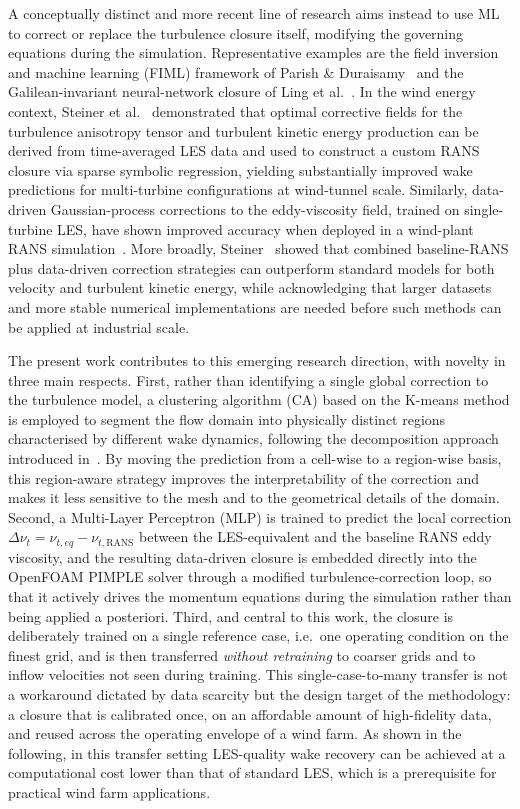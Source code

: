 A conceptually distinct and more recent line of research aims instead to use ML to correct or replace the turbulence closure itself, modifying the governing equations during the simulation. Representative examples are the field inversion and machine learning (FIML) framework of Parish \& Duraisamy~\cite{Duraisamy2019} and the Galilean-invariant neural-network closure of Ling et al.~\cite{Ling2016}. In the wind energy context, Steiner et al.~\cite{Steiner2021} demonstrated that optimal corrective fields for the turbulence anisotropy tensor and turbulent kinetic energy production can be derived from time-averaged LES data and used to construct a custom RANS closure via sparse symbolic regression, yielding substantially improved wake predictions for multi-turbine configurations at wind-tunnel scale. Similarly, data-driven Gaussian-process corrections to the eddy-viscosity field, trained on single-turbine LES, have shown improved accuracy when deployed in a wind-plant RANS simulation~\cite{King_2018}. More broadly, Steiner~\cite{72116acdc5aa4b3b8fc752f1b2fa9958} showed that combined baseline-RANS plus data-driven correction strategies can outperform standard models for both velocity and turbulent kinetic energy, while acknowledging that larger datasets and more stable numerical implementations are needed before such methods can be applied at industrial scale.

The present work contributes to this emerging research direction, with novelty in three main respects. First, rather than identifying a single global correction to the turbulence model, a clustering algorithm (CA) based on the K-means method is employed to segment the flow domain into physically distinct regions characterised by different wake dynamics, following the decomposition approach introduced in~\cite{Clustering_tieghi,Carloni2026}. By moving the prediction from a cell-wise to a region-wise basis, this region-aware strategy improves the interpretability of the correction and makes it less sensitive to the mesh and to the geometrical details of the domain. Second, a Multi-Layer Perceptron (MLP) is trained to predict the local correction $\Delta\nu_t = \nu_{t,eq} - \nu_{t,\mathrm{RANS}}$ between the LES-equivalent and the baseline RANS eddy viscosity, and the resulting data-driven closure is embedded directly into the OpenFOAM PIMPLE solver through a modified turbulence-correction loop, so that it actively drives the momentum equations during the simulation rather than being applied a posteriori. Third, and central to this work, the closure is deliberately trained on a single reference case, i.e.\ one operating condition on the finest grid, and is then transferred \emph{without retraining} to coarser grids and to inflow velocities not seen during training. This single-case-to-many transfer is not a workaround dictated by data scarcity but the design target of the methodology: a closure that is calibrated once, on an affordable amount of high-fidelity data, and reused across the operating envelope of a wind farm. As shown in the following, in this transfer setting LES-quality wake recovery can be achieved at a computational cost lower than that of standard LES, which is a prerequisite for practical wind farm applications.

